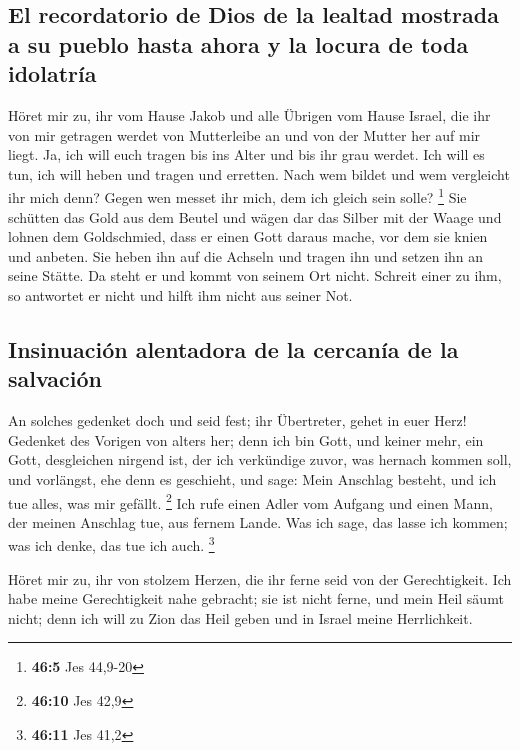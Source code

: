 \hypertarget{el-recordatorio-de-dios-de-la-lealtad-mostrada-a-su-pueblo-hasta-ahora-y-la-locura-de-toda-idolatruxeda}{%
\subsection{El recordatorio de Dios de la lealtad mostrada a su pueblo
hasta ahora y la locura de toda
idolatría}\label{el-recordatorio-de-dios-de-la-lealtad-mostrada-a-su-pueblo-hasta-ahora-y-la-locura-de-toda-idolatruxeda}}

 Höret mir zu, ihr vom Hause Jakob und alle Übrigen vom
Hause Israel, die ihr von mir getragen werdet von Mutterleibe an und von
der Mutter her auf mir liegt.  Ja, ich will euch tragen
bis ins Alter und bis ihr grau werdet. Ich will es tun, ich will heben
und tragen und erretten.  Nach wem bildet und wem
vergleicht ihr mich denn? Gegen wen messet ihr mich, dem ich gleich sein
solle? \footnote{\textbf{46:5} Jes 44,9-20}  Sie schütten
das Gold aus dem Beutel und wägen dar das Silber mit der Waage und
lohnen dem Goldschmied, dass er einen Gott daraus mache, vor dem sie
knien und anbeten.  Sie heben ihn auf die Achseln und
tragen ihn und setzen ihn an seine Stätte. Da steht er und kommt von
seinem Ort nicht. Schreit einer zu ihm, so antwortet er nicht und hilft
ihm nicht aus seiner Not.

\hypertarget{insinuaciuxf3n-alentadora-de-la-cercanuxeda-de-la-salvaciuxf3n}{%
\subsection{Insinuación alentadora de la cercanía de la
salvación}\label{insinuaciuxf3n-alentadora-de-la-cercanuxeda-de-la-salvaciuxf3n}}

 An solches gedenket doch und seid fest; ihr Übertreter,
gehet in euer Herz!  Gedenket des Vorigen von alters her;
denn ich bin Gott, und keiner mehr, ein Gott, desgleichen nirgend ist,
 der ich verkündige zuvor, was hernach kommen soll, und
vorlängst, ehe denn es geschieht, und sage: Mein Anschlag besteht, und
ich tue alles, was mir gefällt. \footnote{\textbf{46:10} Jes 42,9}
 Ich rufe einen Adler vom Aufgang und einen Mann, der
meinen Anschlag tue, aus fernem Lande. Was ich sage, das lasse ich
kommen; was ich denke, das tue ich auch. \footnote{\textbf{46:11} Jes
  41,2}

 Höret mir zu, ihr von stolzem Herzen, die ihr ferne seid
von der Gerechtigkeit.  Ich habe meine Gerechtigkeit nahe
gebracht; sie ist nicht ferne, und mein Heil säumt nicht; denn ich will
zu Zion das Heil geben und in Israel meine Herrlichkeit.

